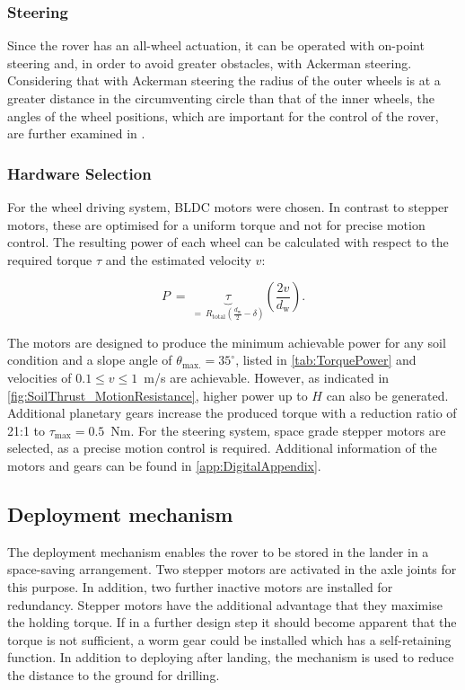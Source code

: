 \subsubsection*{Steering}
\label{sec:Steering}

Since the rover has an all-wheel actuation, it can be operated with on-point steering and, in order to avoid greater obstacles, with Ackerman steering. Considering that with Ackerman steering the radius of the outer wheels is at a greater distance in the circumventing circle than that of the inner wheels, the angles of the wheel positions, which are important for the control of the rover, are further examined in .


\subsubsection*{Hardware Selection}
\label{sec:HardwareLoco}

For the wheel driving system, BLDC motors were chosen. In contrast to stepper motors, these are optimised for a uniform torque and not for precise motion control. The resulting power of each wheel can be calculated with respect to the required torque \(\tau\) and the estimated velocity \(v\):

\begin{equation}
	P \:  = \:	\underbrace{\tau}_{= \:	R_\text{total} \left(\frac{d_\text{w}}{2} - \delta \right)} \left(\frac{2v}{d_\text{w}} \right).
	\label{eq:power}
\end{equation}

The motors are designed to produce the minimum achievable power for any soil condition and a slope angle of \(\theta_\text{max.} = 35^\circ\), listed in \autoref{tab:TorquePower} and velocities of \(0.1 \leq v \leq 1\)~m/s are achievable. However, as indicated in \autoref{fig:SoilThrust_MotionResistance}, higher power up to \(H\) can also be generated. Additional planetary gears increase the produced torque with a reduction ratio of 21:1 to \(\tau_\text{max} = 0.5\)~Nm. For the steering system, space grade stepper motors are selected, as a precise motion control is required. Additional information of the motors and gears can be found in \autoref{app:DigitalAppendix}.


\subsection{Deployment mechanism}

The deployment mechanism enables the rover to be stored in the lander in a space-saving arrangement. Two stepper motors are activated in the axle joints for this purpose. In addition, two further inactive motors are installed for redundancy. Stepper motors have the additional advantage that they maximise the holding torque. If in a further design step it should become apparent that the torque is not sufficient, a worm gear could be installed which has a self-retaining function. In addition to deploying after landing, the mechanism is used to reduce the distance to the ground for drilling. 



